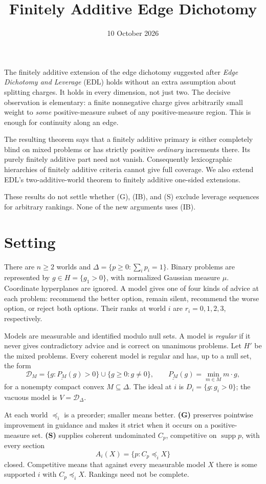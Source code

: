 \documentclass[11pt]{article}
\title{Finitely Additive Edge Dichotomy}
\author{}\date{10 October 2026}
\theoremstyle{remark}\newtheorem{remark}[theorem]{Remark}
\newcommand{\Dscr}{\mathcal D}
\newcommand{\supp}{\operatorname{supp}}
\begin{document}
\maketitle

\noindent
The finitely additive extension of the edge dichotomy suggested after
\emph{Edge Dichotomy and Leverage} (EDL) holds without an extra assumption
about splitting charges. It holds in every dimension, not just two.
The decisive observation is elementary: a finite nonnegative charge gives
arbitrarily small weight to \emph{some} positive-measure subset of any
positive-measure region. This is enough for continuity along an edge.

The resulting theorem says that a finitely additive primary is either
completely blind on mixed problems or has strictly positive \emph{ordinary}
increments there. Its purely finitely additive part need not vanish.
Consequently lexicographic hierarchies of finitely additive criteria cannot
give full coverage. We also extend EDL's two-additive-world theorem to
finitely additive one-sided extensions.

These results do not settle whether (G), (IB), and (S) exclude leverage
sequences for arbitrary rankings. None of the new arguments uses (IB).

\section{Setting}

There are $n\ge2$ worlds and $\Delta=\{p\ge0:\sum_i p_i=1\}$.
Binary problems are represented by $g\in H=\{g_1>0\}$, with normalized
Gaussian measure $\mu$. Coordinate hyperplanes are ignored. A model gives
one of four kinds of advice at each problem: recommend the better option,
remain silent, recommend the worse option, or reject both options. Their
ranks at world $i$ are $r_i=0,1,2,3$, respectively.

Models are measurable and identified modulo null sets. A model is
\emph{regular} if it never gives contradictory advice and is correct on
unanimous problems. Let $H'$ be the mixed problems. Every coherent model is
regular and has, up to a null set, the form
\[
 \Dscr_M=\{g:\underline{P_M}(g)>0\}\cup\{g\ge0:g\ne0\},
 \qquad \underline{P_M}(g)=\min_{m\in M}m\cdot g,
\]
for a nonempty compact convex $M\subseteq\Delta$. The ideal at $i$ is
$D_i=\{g:g_i>0\}$; the vacuous model is $V=\Dscr_\Delta$.

At each world $\preceq_i$ is a preorder; smaller means better.
\textbf{(G)} preserves pointwise improvement in guidance and makes it strict
when it occurs on a positive-measure set. \textbf{(S)} supplies coherent
undominated $C_p$, competitive on $\supp p$, with every section
\[
 A_i(X)=\{p:C_p\preceq_iX\}
\]
closed. Competitive means that against every measurable model $X$ there is
some supported $i$ with $C_p\preceq_iX$. Rankings need not be complete.
\end{document}
